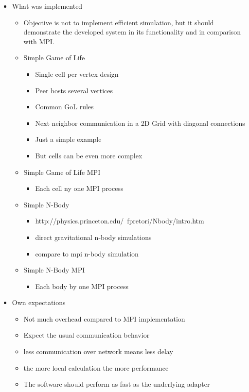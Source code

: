 \begin{itemize}
\item What was implemented
  \begin{itemize}
  \item Objective is not to implement efficient simulation, but
    it should demonstrate the developed system in its functionality
    and in comparison with MPI.
    
  \item Simple Game of Life
    \begin{itemize}
    \item Single cell per vertex design
    \item Peer hosts several vertices
    \item Common GoL rules
    \item Next neighbor communication in a 2D Grid with diagonal connections
    \item Just a simple example
    \item But cells can be even more complex
    \end{itemize}

  \item Simple Game of Life MPI 
    \begin{itemize}
    \item Each cell ny one MPI process
    \end{itemize}

  \item Simple N-Body
    \begin{itemize}
    \item http://physics.princeton.edu/~fpretori/Nbody/intro.htm
    \item direct gravitational n-body simulations
    \item compare to mpi n-body simulation
    \end{itemize}

  \item Simple N-Body MPI
    \begin{itemize}
      \item Each body by one MPI process
    \end{itemize}
  \end{itemize}

\item Own expectations
  \begin{itemize}
  \item Not much overhead compared to MPI implementation
  \item Expect the usual communication behavior
  \item less communication over network means less delay
  \item the more local calculation the more performance
  \item The software should perform as fast as the
    underlying adapter
  \end{itemize}


\end{itemize}
